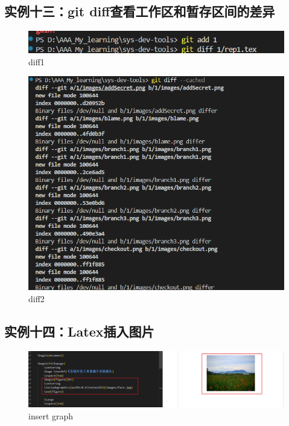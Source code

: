 \documentclass[a4paper]{article}
\begin{document}
\subsection{实例十三：git diff查看工作区和暂存区间的差异}
    
    \begin{figure}[H]
    \centering
    \includegraphics[width=1\textwidth]{images/diff1.png}
    \caption{diff1}
    \end{figure}
    \begin{figure}[H]
    \centering
    \includegraphics[width=1\textwidth]{images/diff2.png}
    \caption{diff2}
    \end{figure}

\subsection{实例十四：Latex插入图片}
    \begin{figure}[H]
    \centering
    \includegraphics[width=1\textwidth]{images/insertGraph.png}
    \caption{insert graph}
    \end{figure}
\end{document}
